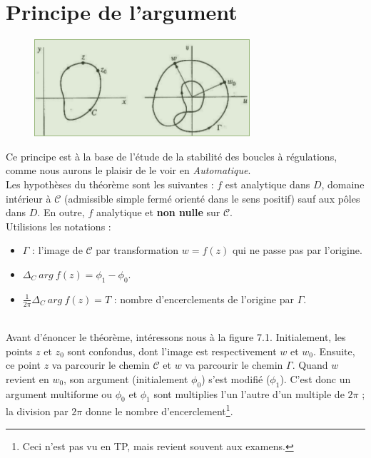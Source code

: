 \section{Principe de l'argument}
\begin{figure}
\includegraphics[scale=0.4]{ch7/image1.png}
\end{figure}
Ce principe est à la base de l'étude de la stabilité des boucles à régulations, comme 
nous aurons le plaisir de le voir en \textit{Automatique}.\\
Les hypothèses du théorème sont les suivantes : $f$ est analytique dans $D$, domaine
intérieur à $\mathcal{C}$ (admissible simple fermé orienté dans le sens positif) sauf 
aux pôles dans $D$. En outre, $f$ analytique et \textbf{non nulle} sur $\mathcal{C}$.\\
Utilisions les notations  :\ \\
\begin{itemize}
\item $\Gamma$ : l'image de $\mathcal{C}$ par transformation $w=f(z)$ qui ne passe pas
par l'origine.
\item $\Delta_C\ arg\ f(z) = \phi_1-\phi_0$.
\item $\frac{1}{2\pi}\Delta_C\ arg\ f(z) = T$ : nombre d'encerclements de l'origine par
$\Gamma$.
\end{itemize}\ \\
Avant d'énoncer le théorème, intéressons nous à la figure 7.1. Initialement, les points
$z$ et $z_0$ sont confondus, dont l'image est respectivement $w$ et $w_0$. Ensuite, 
ce point $z$ va parcourir le chemin $\mathcal{C}$ et $w$ va parcourir le chemin $\Gamma$. 
Quand $w$ revient en $w_0$, son argument (initialement $\phi_0$) s'est modifié ($\phi_1$). 
C'est donc un argument multiforme ou $\phi_0$ et $\phi_1$ sont multiplies l'un l'autre 
d'un multiple de $2\pi$ ; la division par $2\pi$ donne le nombre  d'encerclement\footnote{
Ceci n'est pas vu en TP, mais revient souvent aux examens.}.\\



